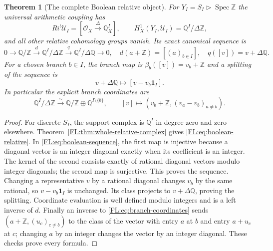 \documentclass[11pt,a4paper]{article}
\newtheorem{theorem}{Theorem}[section]
\theoremstyle{definition}\newtheorem{definition}[theorem]{Definition}
\newcommand{\Spec}{\operatorname{Spec}}\newcommand{\SpecMon}{\operatorname{Spec}_{\mathrm{mon}}}
\providecommand{\RQ}{\mathbb Q}
\begin{document}
\begin{theorem}[The complete Boolean relative object]
\label{FL:thm:boolean-relative}
For $Y_I=S_I\triangleright\Spec\mathbb Z$ the universal arithmetic
coupling has
\[
 Ri^!\mathcal U_I=[\mathcal O_X\xrightarrow\Delta\RQ_X^I],
 \qquad H_X^1(Y_I,\mathcal U_I)=\RQ^I/\Delta\mathbb Z,
 \tag{FL25}\label{FL:eq:boolean-relative}
\]
and all other relative cohomology groups vanish. Its exact canonical
sequence is
\[
 0\longrightarrow\RQ/\mathbb Z
 \xrightarrow{\ d\ }\RQ^I/\Delta\mathbb Z
 \xrightarrow{\ q\ }\RQ^I/\Delta\RQ\longrightarrow0,
 \quad d(a+\mathbb Z)=[(a)_{b\in I}],\quad q([v])=v+\Delta\RQ.
 \tag{FL26}\label{FL:eq:boolean-sequence}
\]
For a chosen branch $b\in I$, the branch map is
$\beta_b([v])=v_b+\mathbb Z$ and a splitting of the sequence is
\[
 v+\Delta\RQ\longmapsto[v-v_b\mathbf1_I].
 \tag{FL27}\label{FL:eq:branch-splitting}
\]
In particular the explicit branch coordinates are
\[
 \RQ^I/\Delta\mathbb Z\xrightarrow{\sim}
 \RQ/\mathbb Z\oplus\RQ^{I\setminus\{b\}},\qquad
 [v]\longmapsto(v_b+\mathbb Z,(v_a-v_b)_{a\ne b}).
 \tag{FL28}\label{FL:eq:branch-coordinates}
\]
\end{theorem}
\begin{proof}
For discrete $S_I$, the support complex is $\RQ^I$ in degree zero
and zero elsewhere. Theorem~\ref{FL:thm:whole-relative-complex} gives
\eqref{FL:eq:boolean-relative}. In \eqref{FL:eq:boolean-sequence}, the
first map is injective because a diagonal vector is an integer
diagonal exactly when its coefficient is an integer. The kernel of
the second consists exactly of rational diagonal vectors modulo
integer diagonals; the second map is surjective. This proves the
sequence. Changing a representative $v$ by a rational diagonal
changes $v_b$ by the same rational, so
$v-v_b\mathbf1_I$ is unchanged. Its class projects to
$v+\Delta\RQ$, proving the splitting. Coordinate evaluation is well
defined modulo integers and is a left inverse of $d$. Finally an
inverse to \eqref{FL:eq:branch-coordinates} sends
$(a+\mathbb Z,(u_c)_{c\ne b})$ to the class of the vector with entry
$a$ at $b$ and entry $a+u_c$ at $c$; changing $a$ by an integer changes
the vector by an integer diagonal. These checks prove every formula.
\end{proof}
\end{document}
